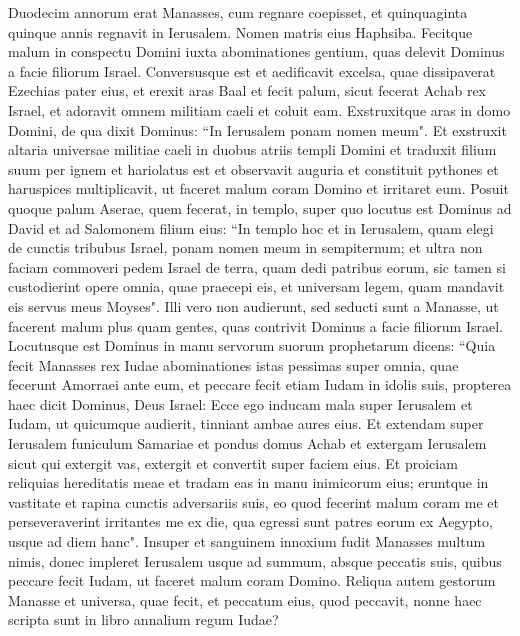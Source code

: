 \begin{biblechapter}  
\verse Duodecim annorum erat Manasses, cum regnare coepisset, et quinquaginta quinque annis regnavit in Ierusalem. Nomen matris eius Haphsiba. 
\verse Fecitque malum in conspectu Domini iuxta abominationes gentium, quas delevit Dominus a facie filiorum Israel. 
\verse Conversusque est et aedificavit excelsa, quae dissipaverat Ezechias pater eius, et erexit aras Baal et fecit palum, sicut fecerat Achab rex Israel, et adoravit omnem militiam caeli et coluit eam. 
\verse Exstruxitque aras in domo Domini, de qua dixit Dominus: “In Ierusalem ponam nomen meum". 
\verse Et exstruxit altaria universae militiae caeli in duobus atriis templi Domini 
\verse et traduxit filium suum per ignem et hariolatus est et observavit auguria et constituit pythones et haruspices multiplicavit, ut faceret malum coram Domino et irritaret eum. 
\verse Posuit quoque palum Aserae, quem fecerat, in templo, super quo locutus est Dominus ad David et ad Salomonem filium eius: “In templo hoc et in Ierusalem, quam elegi de cunctis tribubus Israel, ponam nomen meum in sempiternum; 
\verse et ultra non faciam commoveri pedem Israel de terra, quam dedi patribus eorum, sic tamen si custodierint opere omnia, quae praecepi eis, et universam legem, quam mandavit eis servus meus Moyses". 
\verse Illi vero non audierunt, sed seducti sunt a Manasse, ut facerent malum plus quam gentes, quas contrivit Dominus a facie filiorum Israel. 
\verse Locutusque est Dominus in manu servorum suorum prophetarum dicens: 
\verse “Quia fecit Manasses rex Iudae abominationes istas pessimas super omnia, quae fecerunt Amorraei ante eum, et peccare fecit etiam Iudam in idolis suis, 
\verse propterea haec dicit Dominus, Deus Israel: Ecce ego inducam mala super Ierusalem et Iudam, ut quicumque audierit, tinniant ambae aures eius. 
\verse Et extendam super Ierusalem funiculum Samariae et pondus domus Achab et extergam Ierusalem sicut qui extergit vas, extergit et convertit super faciem eius. 
\verse Et proiciam reliquias hereditatis meae et tradam eas in manu inimicorum eius; eruntque in vastitate et rapina cunctis adversariis suis, 
\verse eo quod fecerint malum coram me et perseveraverint irritantes me ex die, qua egressi sunt patres eorum ex Aegypto, usque ad diem hanc". 
\verse Insuper et sanguinem innoxium fudit Manasses multum nimis, donec impleret Ierusalem usque ad summum, absque peccatis suis, quibus peccare fecit Iudam, ut faceret malum coram Domino. 
\verse Reliqua autem gestorum Manasse et universa, quae fecit, et peccatum eius, quod peccavit, nonne haec scripta sunt in libro annalium regum Iudae? 

\end{biblechapter}
